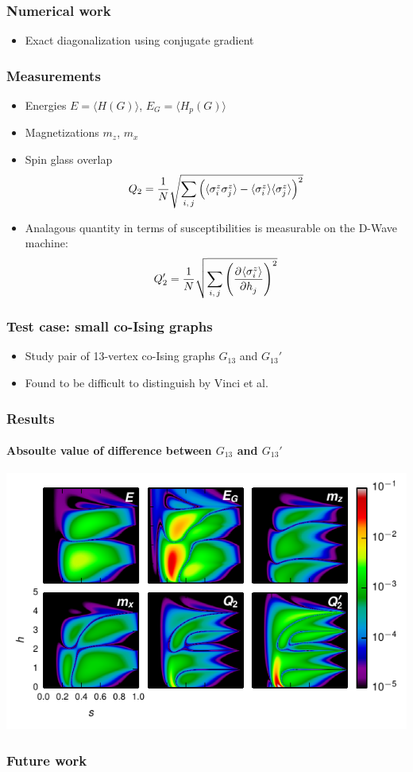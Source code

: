 \documentclass[handout]{beamer}
\newcommand{\ev}[1]{\langle #1 \rangle} %
\begin{document}
\begin{frame}
  \frametitle{Numerical work}
  \begin{itemize}
    \item Exact diagonalization using conjugate gradient
  \end{itemize}
\end{frame}
\begin{frame}
  \frametitle{Measurements}
  \begin{itemize}
    \item Energies $E=\ev{H(G)}$, $E_G=\ev{H_p(G)}$
    \item Magnetizations $m_z$, $m_x$
    \item Spin glass overlap
    \begin{equation*}
      Q_2 = \frac{1}{N} \sqrt{
        \sum_{i,\,j} \del{
          \ev{\sigma^z_i \sigma^z_j} -
          \ev{\sigma^z_i} \ev{\sigma^z_j}
        }^2
      }
    \end{equation*}
    \item Analagous quantity in terms of susceptibilities is measurable on the
      D-Wave machine:
    \begin{equation*}
      Q_2' = \frac{1}{N} \sqrt{\sum_{i,\,j} \del{\dpd{\ev{\sigma^z_i}}{h_j}}^2}
    \end{equation*}
  \end{itemize}
\end{frame}
\begin{frame}
  \frametitle{Test case: small co-Ising graphs}
  \begin{itemize}
    \item Study pair of 13-vertex co-Ising graphs $G_{13}$ and $G_{13}'$
    \item Found to be difficult to distinguish by Vinci et al.
  \end{itemize}
\end{frame}
\begin{frame}
  \frametitle{Results}
  \framesubtitle{Absoulte value of difference between $G_{13}$ and $G_{13}'$}
  \includegraphics[width=\textwidth]{delta-grid}
\end{frame}
\begin{frame}
  \frametitle{Future work}
\end{frame}
\end{document}
